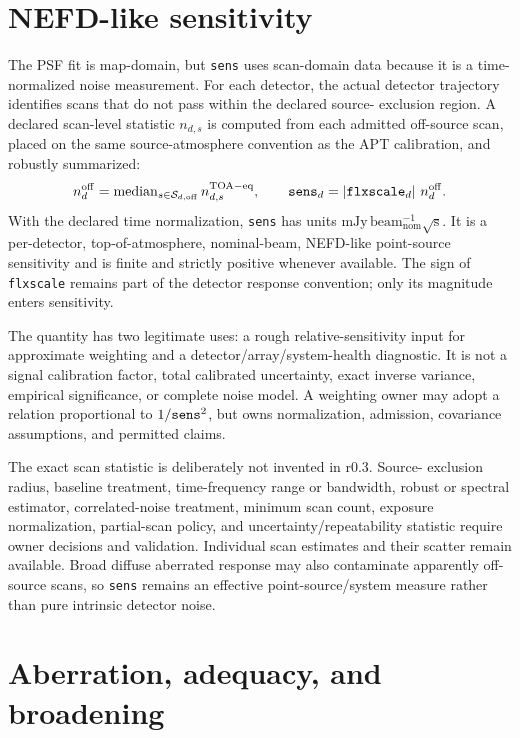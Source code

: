 \documentclass[11pt]{article}
\begin{document}
\section{NEFD-like sensitivity}
\label{sec:sens}

The PSF fit is map-domain, but \texttt{sens} uses scan-domain data because it
is a time-normalized noise measurement. For each detector, the actual detector
trajectory identifies scans that do not pass within the declared source-
exclusion region. A declared scan-level statistic $n_{d,s}$ is computed from
each admitted off-source scan, placed on the same source-atmosphere convention
as the APT calibration, and robustly summarized:
\begin{equation}
n_d^{\rm off}=\operatorname{median}_{s\in\mathcal S_{d,\rm off}}
n_{d,s}^{\rm TOA-eq},
\qquad
{\tt sens}_d=\left|{\tt flxscale}_d\right|\,n_d^{\rm off}.
\label{eq:rationale-sens}
\end{equation}
With the declared time normalization, \texttt{sens} has units
$\mathrm{mJy\,beam_{nom}^{-1}\sqrt{s}}$. It is a per-detector,
top-of-atmosphere, nominal-beam, NEFD-like point-source sensitivity and is
finite and strictly positive whenever available. The sign of
\texttt{flxscale} remains part of the detector response convention; only its
magnitude enters sensitivity.

The quantity has two legitimate uses: a rough relative-sensitivity input for
approximate weighting and a detector/array/system-health diagnostic. It is not
a signal calibration factor, total calibrated uncertainty, exact inverse
variance, empirical significance, or complete noise model. A weighting owner
may adopt a relation proportional to $1/{\tt sens}^2$, but owns normalization,
admission, covariance assumptions, and permitted claims.

The exact scan statistic is deliberately not invented in r0.3. Source-
exclusion radius, baseline treatment, time-frequency range or bandwidth,
robust or spectral estimator, correlated-noise treatment, minimum scan count,
exposure normalization, partial-scan policy, and uncertainty/repeatability
statistic require owner decisions and validation. Individual scan estimates
and their scatter remain available. Broad diffuse aberrated response may also
contaminate apparently off-source scans, so \texttt{sens} remains an effective
point-source/system measure rather than pure intrinsic detector noise.

\section{Aberration, adequacy, and broadening}
\label{sec:adequacy}
\end{document}
